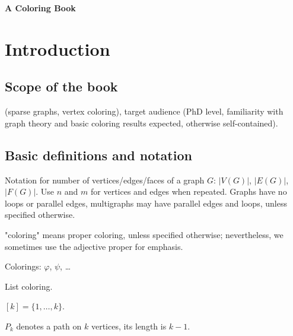\documentclass[12pt,twoside,openright,a4paper]{book}
\begin{document}
\pagestyle{empty}
\begin{titlepage}

\begin{center}

\vspace{10cm}

{\large\bf A Coloring Book}

\end{center}
\end{titlepage}

\newpage

\pagestyle{plain}
\tableofcontents

\newpage

\pagestyle{headings}
\setcounter{page}{1}

\chapter*{Introduction}

\section{Scope of the book}

(sparse graphs, vertex coloring), target audience (PhD level,
familiarity with graph theory and basic coloring results expected, otherwise self-contained).

\section{Basic definitions and notation}


Notation for number of vertices/edges/faces of a graph $G$:
$|V(G)|$, $|E(G)|$, $|F(G)|$.
Use $n$ and $m$ for vertices and edges when repeated.
Graphs have no loops or parallel edges, multigraphs may have parallel edges and loops, unless specified otherwise.

"coloring" means proper coloring, unless specified otherwise; nevertheless, we sometimes use the adjective proper
for emphasis.

Colorings: $\varphi$, $\psi$, \ldots

List coloring.

$[k]=\{1,\ldots,k\}$.

$P_k$ denotes a path on $k$ vertices, its length is $k-1$.
\end{document}
